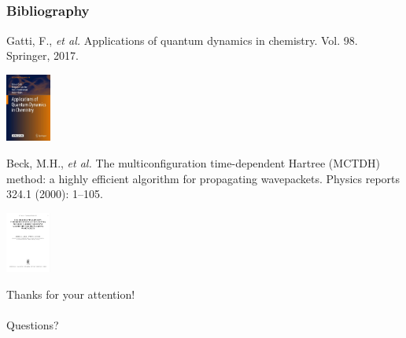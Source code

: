 \documentclass{beamer}
\begin{document}
\subsection[Bibliography]{}\label{biblio}

\begin{frame}
  \frametitle{Bibliography}
  \centering
  \begin{minipage}{.6\linewidth}
Gatti, F., \emph{et al.} Applications of quantum dynamics in chemistry. Vol. 98.
  Springer, 2017.
\end{minipage}
\hspace{1cm}
  \begin{minipage}{.1\linewidth}
\includegraphics[width=4em]{appli.jpg}
\end{minipage}

\vspace{1cm}

  \begin{minipage}{.6\linewidth}
Beck, M.H., \emph{et al.} The multiconfiguration time-dependent Hartree (MCTDH) method: a highly efficient algorithm for propagating wavepackets. Physics reports 324.1 (2000): 1--105. 
\end{minipage}
\hspace{1cm}
  \begin{minipage}{.1\linewidth}
\includegraphics[width=4em]{mctdh_rev.png}
  \end{minipage}
\end{frame}

\begin{frame}
  \centering \Large
  Thanks for your attention!  \\~\\
  Questions?
\end{frame}
\end{document}
